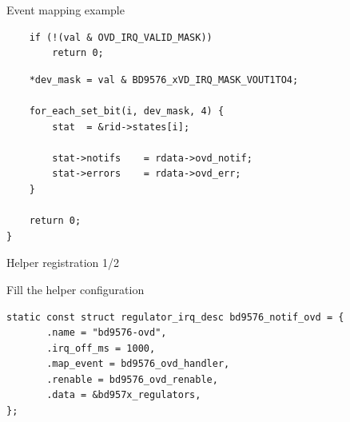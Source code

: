 \documentclass[10pt]{beamer}
\begin{document}
\begin{frame}[fragile]{Event mapping example}
\begin{lstlisting}
	if (!(val & OVD_IRQ_VALID_MASK))
		return 0;
\end{lstlisting}
\pause
\begin{lstlisting}
	*dev_mask = val & BD9576_xVD_IRQ_MASK_VOUT1TO4;

	for_each_set_bit(i, dev_mask, 4) {
		stat  = &rid->states[i];

		stat->notifs	= rdata->ovd_notif;
		stat->errors	= rdata->ovd_err;
	}

	return 0;
}

\end{lstlisting}
\end{frame}



\begin{frame}[fragile]{Helper registration 1/2}

\lstset{language=C}

Fill the helper configuration
\scriptsize

\pause
\begin{lstlisting}
static const struct regulator_irq_desc bd9576_notif_ovd = {              
       .name = "bd9576-ovd",                                            
       .irq_off_ms = 1000,                                              
       .map_event = bd9576_ovd_handler,                                 
       .renable = bd9576_ovd_renable,                                   
       .data = &bd957x_regulators,                                      
}; 
\end{lstlisting}
\end{frame}
\end{document}
